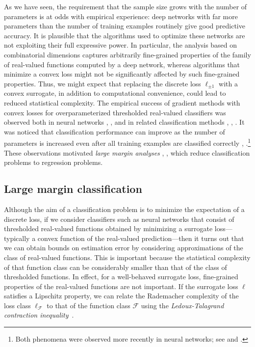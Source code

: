 As we have seen, the requirement that the sample size grows with the number of parameters is at odds with empirical experience: deep networks with far more parameters than the number of training examples routinely give good predictive accuracy.  It is plausible that the algorithms used to optimize these networks are not exploiting their full expressive power. In particular, the analysis based on combinatorial dimensions captures arbitrarily fine-grained properties of the family of real-valued functions computed by a deep network, whereas algorithms that minimize a convex loss might not be significantly affected by such fine-grained properties.  Thus, we might expect that replacing the discrete loss $\ell_{\pm 1}$ with a convex surrogate, in addition to computational convenience, could lead to reduced statistical complexity. The empirical success of gradient methods with convex losses for overparameterized thresholded real-valued classifiers was observed both in neural networks \cite{mp-rhpld-90}, \cite{lgt-lnnt-97}, \cite{clg-onn-01} and in related classification methods \cite{dc-bdt-95}, \cite{q-bbc-96}, \cite{b-ac-98}. It was noticed that classification performance can improve as the number of parameters is increased even after all training examples are classified correctly \cite{q-bbc-96},
\cite{b-ac-98}.\footnote{Both phenomena were observed more recently in neural networks; see \cite{zhang2016understanding} and \cite{neyshabur2017geometry}.} These observations motivated
{\em large margin analyses} \cite{b-scpcnn-98}, \cite{schapire1998boosting}, which reduce classification problems to regression problems.

\subsection{Large margin classification}

Although the aim of a classification problem is to minimize the expectation of a discrete loss, if we consider classifiers such as neural networks that consist of thresholded real-valued functions obtained by minimizing a surrogate loss---typically a convex function of the real-valued prediction---then it turns out that we can obtain bounds on estimation error by considering approximations of the class of real-valued functions.  This is important because the statistical complexity of that function class can be considerably smaller than that of the class of thresholded functions. In effect, for a well-behaved surrogate loss, fine-grained properties of the real-valued functions are not important. If the surrogate loss $\ell$ satisfies a Lipschitz property, we can relate the Rademacher complexity of the loss class $\ell_{{\mathcal F}}$ to that of the function class ${\mathcal F}$ using the {\em Ledoux-Talagrand contraction
inequality}~\cite[Theorem~4.12]{lt-pbsip-91}.

